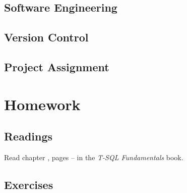 \documentclass{article}
\begin{document}
        \subsection{Software Engineering}

        
        \subsection{Version Control}


        \subsection{Project Assignment}

    \section{Homework}


        \subsection{Readings}

        Read chapter  , pages   --   in the \textit{T-SQL Fundamentals} book.
        
        \subsection{Exercises}
\end{document}
